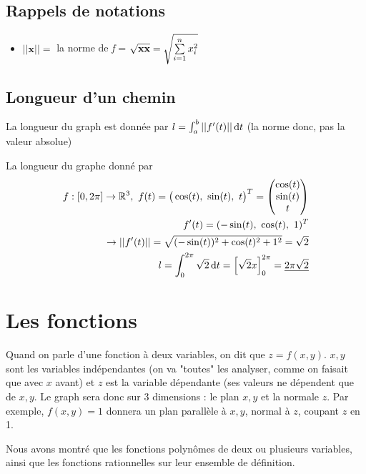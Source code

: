 \documentclass[12pt,a4paper]{article}
\renewcommand{\)}{\right)}
\renewcommand{\(}{\left(}
\begin{document}
\subsection{Rappels de notations}
\begin{itemize}
	\item $||\textbf{x}|| =$ la norme de \textit{f} = $\sqrt{\textbf{xx}} = \sqrt{\somme{n}{i=1}{x_i^2}}$
\end{itemize}
\subsection{Longueur d'un chemin}
La longueur du graph est donnée par $l = \intt{a}{b}{||f'(t)||}$ (la norme donc, pas la valeur absolue)\\
\begin{exemple}
	La longueur du graphe donné par 
	\begin{align*}
		f: [0,2\pi] \to \R^3,\ f(t) = \big(\cos(t),\ \sin(t),\ t\big)^T = 
		\begin{pmatrix}
			\cos(t)\\
			\sin(t)\\
			t
		\end{pmatrix}\\
		f'(t) = (-\sin(t),\ \cos(t),\ 1)^T \\
		\to ||f'(t)|| =\sqrt{(-\sin(t))^2 + \cos(t)^2 + 1^2} = \sqrt{2}\\
		l = \intt{0}{2\pi}{\sqrt{2}} = \left[\sqrt{2}x\right]_0^{2\pi} = \uline{2\pi\sqrt{2}}
	\end{align*}
\end{exemple}


\section{Les fonctions}
Quand on parle d'une fonction à deux variables, on dit que $z = f(x,y)$. $x,y$ sont les variables indépendantes (on va "toutes" les analyser, comme on faisait que avec $x$ avant) et $z$ est la variable dépendante (ses valeurs ne dépendent que de $x,y$. Le graph sera donc sur 3 dimensions : le plan $x,y$ et la normale $z$. Par exemple, $f(x,y) = 1$ donnera un plan parallèle à $x,y$, normal à $z$, coupant $z$ en 1.

Nous avons montré que les fonctions polynômes de deux ou plusieurs variables, ainsi que les fonctions rationnelles  sur leur ensemble de définition.
\end{document}
